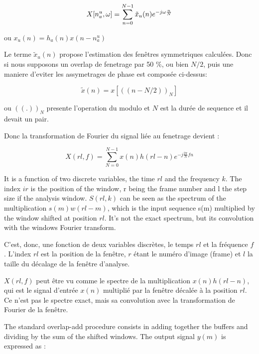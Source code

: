 \begin{equation}
    X[n_a^u, \omega] = \sum_{n=0} ^{N-1} \tilde{x}_u(n) e^{-j \omega \frac{n}{N}} \vspace{0.5cm} 
\end{equation}

\hspace{5cm} ou \hspace{1cm} ${x}_u(n) = h_a(n) x(n-n_a^u)$ 

Le terme $\tilde{x}_u(n)$ propose l'estimation des fenêtres symmetriques calculées. Donc si nous supposons un overlap de fenetrage par 50 \%, ou bien $N/2$, puis une maniere d'eviter les assymetrages de phase est composée ci-dessus:  

\begin{equation}
    \tilde{x}(n) = x[((n-N/2))_N] 
\end{equation}

ou $((.))_N$ presente l'operation du modulo et $N$ est la durée de sequence et il devait un pair.



Donc la transformation de Fourier du signal liée au fenetrage devient :

\begin{equation}
    X(rl,f) = \sum_{N=0}^{N-1} x(n) h(rl-n) e^{-j \frac{2 \pi}{N} fn}
\end{equation}

It is a function of two discrete variables, the time $rl$ and the frequency $k$. The index $ir$ is the position of the window, r being the frame number and l the step size if the analysis window. $S(rl, k)$ can be seen as the spectrum of the multiplication $s(m)w(rl-m)$, which is the input sequence s(m) multiplied by the window shifted at position $rl$. It's not the exact spectrum, but its convolution with the windows Fourier transform.

C'est, donc, une fonction de deux variables discrètes, le temps $rl$ et la fréquence $f$. L'index $rl$ est la position de la fenêtre, $r$ étant le numéro d'image (frame) et $l$ la taille du décalage de la fenêtre d'analyse.

$X(rl, f)$ peut être vu comme le spectre de la multiplication $x(n)h(rl-n)$, qui est le signal d'entrée $x(n)$ multiplié par la fenêtre décalée à la position $rl$. Ce n'est pas le spectre exact, mais sa convolution avec la transformation de Fourier de la fenêtre.


The standard overlap-add procedure consists in adding together the buffers and dividing by the sum of the shifted windows. The output signal $y(m)$ is expressed as : 

